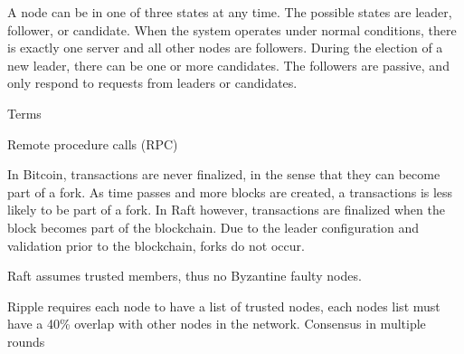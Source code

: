 A node can be in one of three states at any time. The possible states are leader, follower, or candidate. 
When the system operates under normal conditions, there is exactly one server and all other nodes are followers. During the election of a new leader, there can be one or more candidates. The followers are passive, and only respond to requests from leaders or candidates. 

Terms

Remote procedure calls (RPC)

%


In Bitcoin, transactions are never finalized, in the sense that they can become part of a fork. As time passes and more blocks are created, a transactions is less likely to be part of a fork. In Raft however, transactions are finalized when the block becomes part of the blockchain. Due to the leader configuration and validation prior to the blockchain, forks do not occur. 

Raft assumes trusted members, thus no Byzantine faulty nodes. 






Ripple requires each node to have a list of trusted nodes, each nodes list must have a 40\% overlap with other nodes in the network. Consensus in multiple rounds



 
